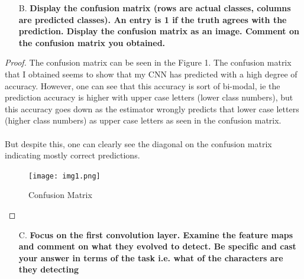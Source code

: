 \documentclass{article}
\theoremstyle{case}
\begin{document}
\begin{enumerate}
    \item [B.] \textbf{Display the confusion matrix (rows are actual classes, columns
are predicted classes). An entry is 1 if the truth agrees with the
prediction. Display the confusion matrix as an image. Comment
on the confusion matrix you obtained.}
\end{enumerate}
\begin{proof}
The confusion matrix can be seen in the Figure 1. The confusion matrix that I obtained seems to show that my CNN has predicted with a high degree of accuracy. However, one can see that this accuracy is sort of bi-modal, ie the prediction accuracy is higher with upper case letters (lower class numbers), but this accuracy goes down as the estimator wrongly predicts that lower case letters (higher class numbers) as upper case letters as seen in the confusion matrix.\\ \\ But despite this, one can clearly see the diagonal on the confusion matrix indicating mostly correct predictions. 
\begin{figure}[h]
            \caption{Confusion Matrix}
            \centering
            \texttt{[image: img1.png]}
            
            \end{figure}

\end{proof}
\begin{enumerate}
    \item [C.] \textbf{Focus on the first convolution layer. Examine the feature maps
and comment on what they evolved to detect. Be specific and cast
your answer in terms of the task i.e. what of the characters are
they detecting}
\end{enumerate} 
\end{document}

